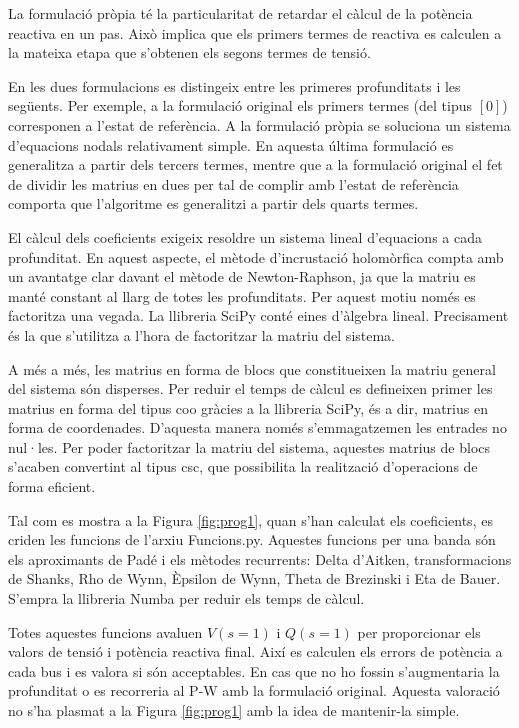 La formulació pròpia té la particularitat de retardar el càlcul de la potència reactiva en un pas. Això implica que els primers termes de reactiva es calculen a la mateixa etapa que s'obtenen els segons termes de tensió.

En les dues formulacions es distingeix entre les primeres profunditats i les següents. Per exemple, a la formulació original els primers termes (del tipus $[0]$) corresponen a l'estat de referència. A la formulació pròpia se soluciona un sistema d'equacions nodals relativament simple. En aquesta última formulació es generalitza a partir dels tercers termes, mentre que a la formulació original el fet de dividir les matrius en dues per tal de complir amb l'estat de referència comporta que l'algoritme es generalitzi a partir dels quarts termes. 

El càlcul dels coeficients exigeix resoldre un sistema lineal d'equacions a cada profunditat. En aquest aspecte, el mètode d'incrustació holomòrfica compta amb un avantatge clar davant el mètode de Newton-Raphson, ja que la matriu es manté constant al llarg de totes les profunditats. Per aquest motiu només es factoritza una vegada. La llibreria SciPy conté eines d'àlgebra lineal. Precisament és la que s'utilitza a l'hora de factoritzar la matriu del sistema. 

A més a més, les matrius en forma de blocs que constitueixen la matriu general del sistema són disperses. Per reduir el temps de càlcul es defineixen primer les matrius en forma del tipus coo gràcies a la llibreria SciPy, és a dir, matrius en forma de coordenades. D'aquesta manera només s'emmagatzemen les entrades no nul·les. Per poder factoritzar la matriu del sistema, aquestes matrius de blocs s'acaben convertint al tipus csc, que possibilita la realització d'operacions de forma eficient. 

Tal com es mostra a la Figura \ref{fig:prog1}, quan s'han calculat els coeficients, es criden les funcions de l'arxiu Funcions.py. Aquestes funcions per una banda són els aproximants de Padé i els mètodes recurrents: Delta d'Aitken, transformacions de Shanks, Rho de Wynn, Èpsilon de Wynn, Theta de Brezinski i Eta de Bauer. S'empra la llibreria Numba per reduir els temps de càlcul.  

Totes aquestes funcions avaluen $V(s=1)$ i $Q(s=1)$ per proporcionar els valors de tensió i potència reactiva final. Així es calculen els errors de potència a cada bus i es valora si són acceptables. En cas que no ho fossin s'augmentaria la profunditat o es recorreria al P-W amb la formulació original. Aquesta valoració no s'ha plasmat a la Figura \ref{fig:prog1} amb la idea de mantenir-la simple.

